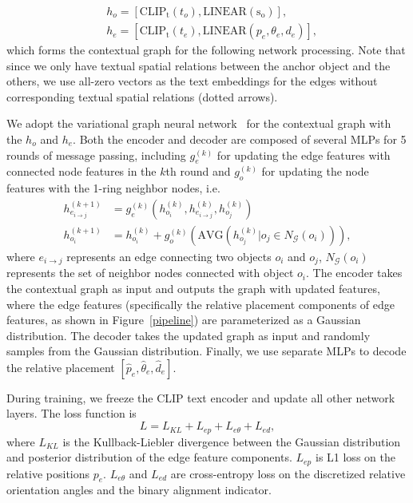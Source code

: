 \begin{equation}
\begin{aligned}
& h_o = [\mathrm{CLIP_t}(t_o), \mathrm{LINEAR(s_o)}], \\
& h_e = [\mathrm{CLIP_t}(t_e), \mathrm{LINEAR}(p_e, \theta_e, d_e)],
\end{aligned}
\end{equation}
which forms the contextual graph for the following network processing. Note that since we only have textual spatial relations between the anchor object and the others, we use all-zero vectors as the text embeddings for the edges without corresponding textual spatial relations (dotted arrows). 

We adopt the variational graph neural network~\cite{zhai2024commonscenes} for the contextual graph with the $h_o$ and $h_e$. Both the encoder and decoder are composed of several MLPs for 5 rounds of message passing, including $g_e^{(k)}$ for updating the edge features with connected node features in the $k$th round and $g_o^{(k)}$ for updating the node features with the 1-ring neighbor nodes, i.e. 
\begin{equation}
\begin{aligned}
h_{e_{i\xrightarrow{} j}}^{(k+1)}&=g_e^{(k)}(h_{o_i}^{(k)}, h_{e_{i\xrightarrow{} j}}^{(k)}, h_{o_j}^{(k)}) \\
h_{o_i}^{(k+1)} &=h_{o_i}^{(k)} + g_o^{(k)}(\mathrm{AVG}(h_{o_j}^{(k)}|o_j \in N_ \mathcal{G}(o_i))),
\end{aligned}
\end{equation}
where $e_{i\xrightarrow{} j}$ represents an edge connecting two objects $o_i$ and $o_j$, $N_\mathcal{G}(o_i)$ represents the set of neighbor nodes connected with object $o_i$. The encoder takes the contextual graph as input and outputs the graph with updated features, where the edge features (specifically the relative placement components of edge features, as shown in Figure~\ref{pipeline}) are parameterized as a Gaussian distribution. The decoder takes the updated graph as input and randomly samples from the Gaussian distribution. Finally, we use separate MLPs to decode the relative placement $[\hat{p}_e, \hat{\theta}_e, \hat{d}_e]$.

During training, we freeze the CLIP text encoder and update all other network layers. The loss function is 
\begin{equation}
L=L_{KL} + L_{ep} + L_{e\theta} + L_{ed},
\end{equation}
where $L_{KL}$ is the Kullback-Liebler divergence between the Gaussian distribution and
posterior distribution of the edge feature components. $L_{ep}$ is L1 loss on the relative positions $p_e$. $L_{e\theta}$ and $L_{ed}$ are cross-entropy loss on the discretized relative orientation angles and the binary alignment indicator.

